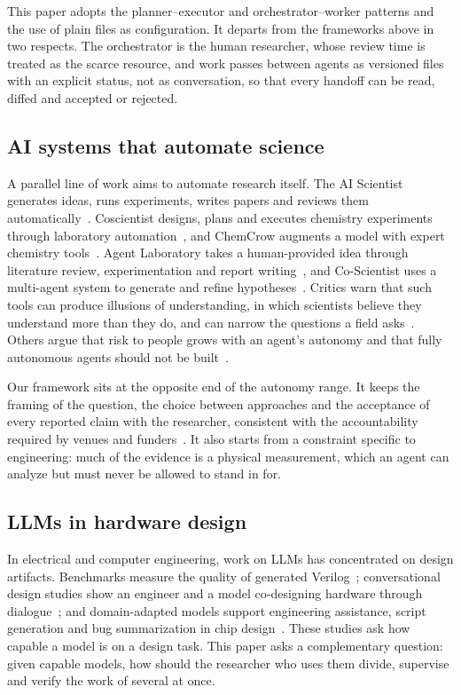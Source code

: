 This paper adopts the planner--executor and orchestrator--worker patterns and the use of
plain files as configuration. It departs from the frameworks above in two respects. The
orchestrator is the human researcher, whose review time is treated as the scarce
resource, and work passes between agents as versioned files with an explicit status,
not as conversation, so that every handoff can be read, diffed and accepted or rejected.

\subsection{AI systems that automate science}
\label{sec:rw-science}

A parallel line of work aims to automate research itself. The AI Scientist generates
ideas, runs experiments, writes papers and reviews them automatically~\cite{lu2024aiscientist}.
Coscientist designs, plans and executes chemistry experiments through laboratory
automation~\cite{boiko2023autonomous}, and ChemCrow augments a model with expert chemistry
tools~\cite{bran2024chemcrow}. Agent Laboratory takes a human-provided idea through
literature review, experimentation and report writing~\cite{schmidgall2025agentlab}, and
Co-Scientist uses a multi-agent system to generate and refine
hypotheses~\cite{gottweis2025coscientist}. Critics warn that such tools can produce
illusions of understanding, in which scientists believe they understand more than they
do, and can narrow the questions a field asks~\cite{messeri2024illusions}. Others argue
that risk to people grows with an agent's autonomy and that fully autonomous agents should
not be built~\cite{mitchell2025fully}.

Our framework sits at the opposite end of the autonomy range. It keeps the framing of the
question, the choice between approaches and the acceptance of every reported claim with
the researcher, consistent with the accountability required by venues and
funders~\cite{arxiv2025genai,thorp2023chatgpt,nature2023tools,ec2025living}. It also
starts from a constraint specific to engineering: much of the evidence is a physical
measurement, which an agent can analyze but must never be allowed to stand in for.

\subsection{LLMs in hardware design}
\label{sec:rw-eda}

In electrical and computer engineering, work on LLMs has concentrated on design
artifacts. Benchmarks measure the quality of generated Verilog~\cite{thakur2023benchmarking,liu2023verilogeval};
conversational design studies show an engineer and a model co-designing hardware
through dialogue~\cite{blocklove2023chipchat}; and domain-adapted models support
engineering assistance, script generation and bug summarization in chip
design~\cite{liu2023chipnemo}. These studies ask how capable a model is on a design task.
This paper asks a complementary question: given capable models, how should the
researcher who uses them divide, supervise and verify the work of several at once.

